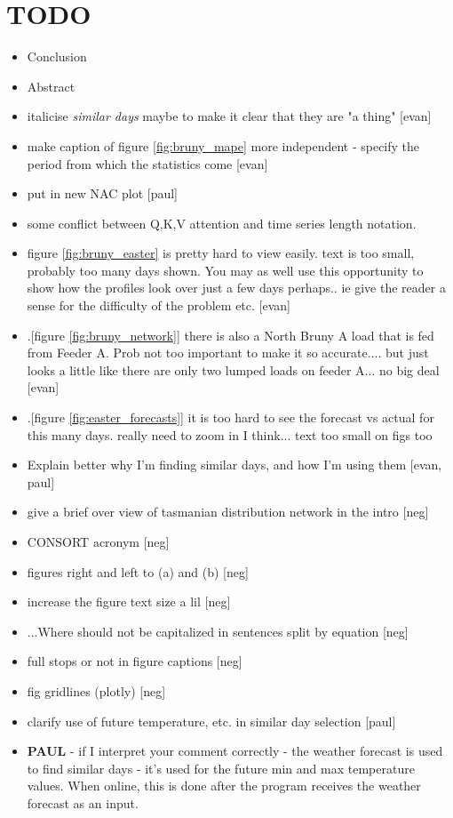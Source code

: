 \documentclass[conference]{IEEEtran}
\begin{document}
\section{TODO} 
\begin{itemize}
	\item Conclusion
	\item Abstract
	\item italicise \textit{similar days} maybe to make it clear that they are "a thing" [evan]
	\item make caption of figure \ref{fig:bruny_mape} more independent - specify the period from which the statistics come [evan]
	\item put in new NAC plot [paul]
	\item some conflict between Q,K,V attention and time series length notation.
	\item figure \ref{fig:bruny_easter} is pretty hard to view easily. text is too small, probably too many days shown. You may as well use this opportunity to show how the profiles look over just a few days perhaps.. ie give the reader a sense for the difficulty of the problem etc. [evan]
	\item  .[figure \ref{fig:bruny_network}]  there is also a North Bruny A load  that is fed from Feeder A. Prob not too important to make it so accurate.... but just looks a little like there are only two lumped loads on feeder A... no big deal  [evan]
	\item .[figure \ref{fig:easter_forecasts}] it is too hard to see the forecast vs actual for this many days. really need to zoom in I think... text too small on figs too
	\item Explain better why I'm finding similar days, and how I'm using them [evan, paul]
	\item give a brief over view of tasmanian distribution network in the intro [neg]
	\item CONSORT acronym [neg]
	\item figures right and left to (a) and (b) [neg]
	\item increase the figure text size a lil [neg]
	\item ...Where should not be capitalized in sentences split by equation [neg]
	\item full stops or not in figure captions [neg]
	\item fig gridlines (plotly) [neg]
	\item clarify use of future temperature, etc. in similar day selection [paul]
	\item \textbf{PAUL} - if I interpret your comment correctly - the weather forecast is used to find similar days - it's used for the future min and max temperature values. When online, this is done after the program receives the weather forecast as an input.

\end{itemize}
\end{document}
